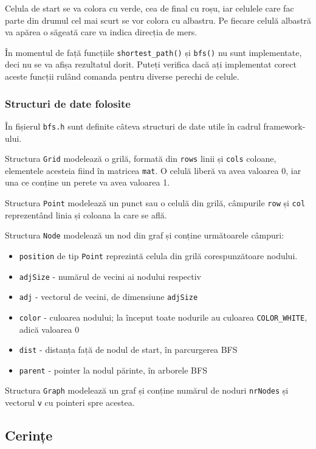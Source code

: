 \documentclass[../ro-fa-lab.tex]{subfiles}
\begin{document}
Celula de start se va colora cu verde, cea de final cu roșu, iar celulele care fac parte din drumul cel mai scurt se vor colora cu albastru. Pe fiecare celulă albastră va apărea o săgeată care va indica direcția de mers.

În momentul de față funcțiile \texttt{shortest\_path()} și \texttt{bfs()} nu sunt implementate, deci nu se va afișa rezultatul dorit. Puteți verifica dacă ați implementat corect aceste funcții rulând comanda pentru diverse perechi de celule.

\subsubsection{Structuri de date folosite}
În fișierul \texttt{bfs.h} sunt definite câteva structuri de date utile în cadrul framework-ului.

Structura \texttt{Grid} modelează o grilă, formată din \texttt{rows} linii și \texttt{cols} coloane, elementele acesteia fiind în matricea \texttt{mat}. O celulă liberă va avea valoarea 0, iar una ce conține un perete va avea valoarea 1.

Structura \texttt{Point} modelează un punct sau o celulă din grilă, câmpurile \texttt{row} și \texttt{col} reprezentând linia și coloana la care se află.

Structura \texttt{Node} modelează un nod din graf și conține următoarele câmpuri:
\begin{itemize}
    \item \texttt{position} de tip \texttt{Point} reprezintă celula din grilă corespunzătoare nodului.
    \item \texttt{adjSize} - numărul de vecini ai nodului respectiv
    \item \texttt{adj} - vectorul de vecini, de dimensiune \texttt{adjSize}
    \item \texttt{color} - culoarea nodului; la început toate nodurile au culoarea \texttt{COLOR\_WHITE}, adică valoarea 0
    \item \texttt{dist} - distanța față de nodul de start, în parcurgerea BFS
    \item \texttt{parent} - pointer la nodul părinte, în arborele BFS
\end{itemize}

Structura \texttt{Graph} modelează un graf și conține numărul de noduri \texttt{nrNodes} și vectorul \texttt{v} cu pointeri spre acestea.

\subsection{Cerințe}
\end{document}
